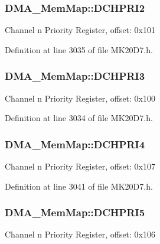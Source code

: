 \subsubsection[{\texorpdfstring{D\+C\+H\+P\+R\+I2}{DCHPRI2}}]{ D\+M\+A\+\_\+\+Mem\+Map\+::\+D\+C\+H\+P\+R\+I2}\hypertarget{struct_d_m_a___mem_map_aaaf25927b861a848c8bf345ec33ecd01}{}\label{struct_d_m_a___mem_map_aaaf25927b861a848c8bf345ec33ecd01}
Channel n Priority Register, offset\+: 0x101 

Definition at line 3035 of file M\+K20\+D7.\+h.

\subsubsection[{\texorpdfstring{D\+C\+H\+P\+R\+I3}{DCHPRI3}}]{ D\+M\+A\+\_\+\+Mem\+Map\+::\+D\+C\+H\+P\+R\+I3}\hypertarget{struct_d_m_a___mem_map_ac11b0b7296f6e76f0d69fb0e87ced548}{}\label{struct_d_m_a___mem_map_ac11b0b7296f6e76f0d69fb0e87ced548}
Channel n Priority Register, offset\+: 0x100 

Definition at line 3034 of file M\+K20\+D7.\+h.

\subsubsection[{\texorpdfstring{D\+C\+H\+P\+R\+I4}{DCHPRI4}}]{ D\+M\+A\+\_\+\+Mem\+Map\+::\+D\+C\+H\+P\+R\+I4}\hypertarget{struct_d_m_a___mem_map_a029c117ad9e471dc1a34bc9b2f6c66c6}{}\label{struct_d_m_a___mem_map_a029c117ad9e471dc1a34bc9b2f6c66c6}
Channel n Priority Register, offset\+: 0x107 

Definition at line 3041 of file M\+K20\+D7.\+h.

\subsubsection[{\texorpdfstring{D\+C\+H\+P\+R\+I5}{DCHPRI5}}]{ D\+M\+A\+\_\+\+Mem\+Map\+::\+D\+C\+H\+P\+R\+I5}\hypertarget{struct_d_m_a___mem_map_a4bfc2aa5a849643e32da3612393f5b2b}{}\label{struct_d_m_a___mem_map_a4bfc2aa5a849643e32da3612393f5b2b}
Channel n Priority Register, offset\+: 0x106 

